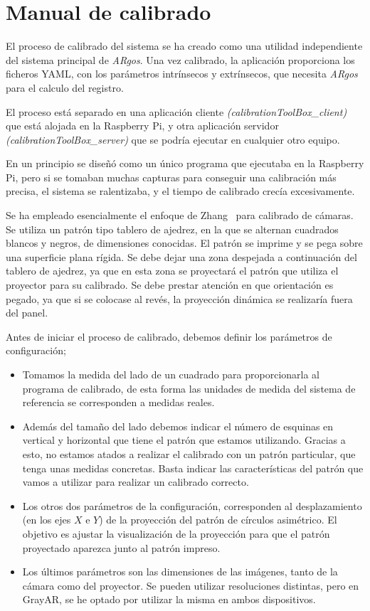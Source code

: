 \chapter{Manual de calibrado}

El proceso de calibrado del sistema se ha creado como una utilidad independiente del sistema principal de \textit{ARgos}. Una vez calibrado, la aplicación proporciona los ficheros YAML, con los parámetros intrínsecos y extrínsecos, que necesita \textit{ARgos} para el calculo del registro.

El proceso está separado en una aplicación cliente \textit{(calibrationToolBox\_client)} que está alojada en la Raspberry Pi, y otra aplicación servidor \textit{(calibrationToolBox\_server)} que se podría ejecutar en cualquier otro equipo.

En un principio se diseñó como un único programa que ejecutaba en la Raspberry Pi, pero si se tomaban muchas capturas para conseguir una calibración más precisa, el sistema se ralentizaba, y el tiempo de calibrado crecía excesivamente.  

Se ha empleado esencialmente el enfoque de Zhang~\cite{Zhang} para calibrado de cámaras. Se utiliza un patrón tipo tablero de ajedrez, en la que se alternan cuadrados blancos y negros, de dimensiones conocidas. El patrón se imprime y se pega sobre una superficie plana rígida. Se debe dejar una zona despejada a continuación del tablero de ajedrez, ya que en esta zona se proyectará el patrón que utiliza el proyector para su calibrado. Se debe prestar atención en que orientación es pegado, ya que si se colocase al revés, la proyección dinámica se realizaría fuera del panel.

Antes de iniciar el proceso de calibrado, debemos definir los parámetros de configuración;

\begin{itemize} 
\item Tomamos la medida del lado de un cuadrado para proporcionarla al programa de calibrado, de esta forma las unidades de medida del sistema de referencia se corresponden a medidas reales. 

\item Además del tamaño del lado debemos indicar el número de esquinas en vertical y horizontal que tiene el patrón que estamos utilizando. Gracias a esto, no estamos atados a realizar el calibrado con un patrón particular, que tenga unas medidas concretas. Basta indicar las características del patrón que vamos a utilizar para realizar un calibrado correcto.

\item Los otros dos parámetros de la configuración, corresponden al desplazamiento (en los ejes $X$ e $Y$) de la proyección del patrón de círculos asimétrico. El objetivo es ajustar la visualización de la proyección para que el patrón proyectado aparezca junto al patrón impreso. 

\item Los últimos parámetros son las dimensiones de las imágenes, tanto de la cámara como del proyector. Se pueden utilizar resoluciones distintas, pero en GrayAR, se he optado por utilizar la misma en ambos dispositivos.  
\end{itemize}

